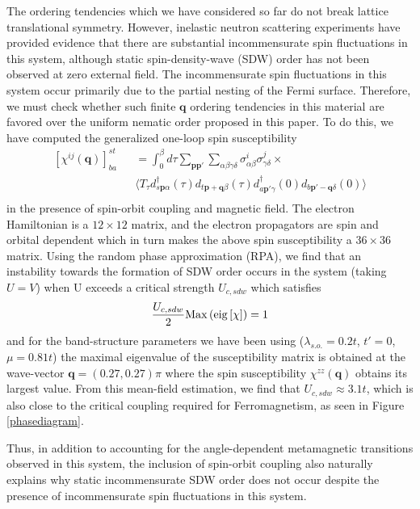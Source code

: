 \documentclass[prb,aps,amssymb,showpacs,twocolumn,amsmath,floatfix]{revtex4}
\begin{document}
The ordering tendencies which we have considered so far do not break lattice translational symmetry.  
However, inelastic neutron scattering experiments \cite{Capogna2003, Ramos2008} have 
provided evidence that there are substantial incommensurate spin fluctuations in this system, 
although static spin-density-wave (SDW) order has not been observed at zero 
external field.  The incommensurate spin fluctuations in this system occur 
primarily due to the partial nesting of the Fermi surface.  Therefore, we must check whether 
such finite $\bm q$ ordering tendencies in this material are favored over the uniform nematic order 
proposed in this paper.  To do this, we have computed  the generalized one-loop spin susceptibility
\begin{eqnarray}
\left[ \chi^{i j}(\bm q) \right]^{s t}_{b a} && = \int_0^{\beta} d \tau \sum_{\bm p \bm p'} \sum_{\alpha \beta \gamma \delta} \nonumber \sigma^i_{\alpha \beta} \sigma^j_{\gamma \delta}  \times \\
&& \langle T_{\tau} d^{\dagger}_{s \bm p \alpha}(\tau) d_{t \bm p + \bm q \beta } (\tau) d^{\dagger}_{a \bm p' \gamma} (0) d_{b \bm p' - \bm q  \delta}(0) \rangle  \nonumber \\
\end{eqnarray}
%
in the presence of spin-orbit coupling and magnetic field. The electron Hamiltonian is a $ 12 \times 12$ matrix, and the electron propagators are spin and orbital
dependent 
which in turn makes the above spin susceptibility a $ 36 \times 36 $ matrix.   
Using the random phase approximation (RPA), we find that an instability towards the formation of SDW 
order occurs in the system (taking $U=V$) when U exceeds a critical strength $U_{c,sdw}$ which satisfies 
\begin{equation}
\frac{U_{c,sdw}}{2} {\rm Max}  \left( {\rm eig} \left[  \chi \right]   \right)  = 1
\end{equation}
and for the band-structure parameters we have been using ($\lambda_{s.o.} = 0.2 t$, $t'=0$, $\mu = 0.81t$) the maximal eigenvalue of the susceptibility matrix is obtained at the wave-vector $ \bm q = \left( 0.27, 0.27 \right) \pi $ where the spin susceptibility $\chi^{zz}(\bm q)$ obtains its largest value.  From this mean-field estimation, we find that $U_{c,sdw} \approx 3.1t$, which is also close to the critical coupling required for Ferromagnetism, as seen in Figure 
\ref{phasediagram}.  

Thus, in addition to accounting for the angle-dependent metamagnetic transitions observed in this system, the inclusion of spin-orbit coupling also naturally explains why static incommensurate 
SDW order does not occur despite the presence of incommensurate spin fluctuations  in this system.
\end{document}
